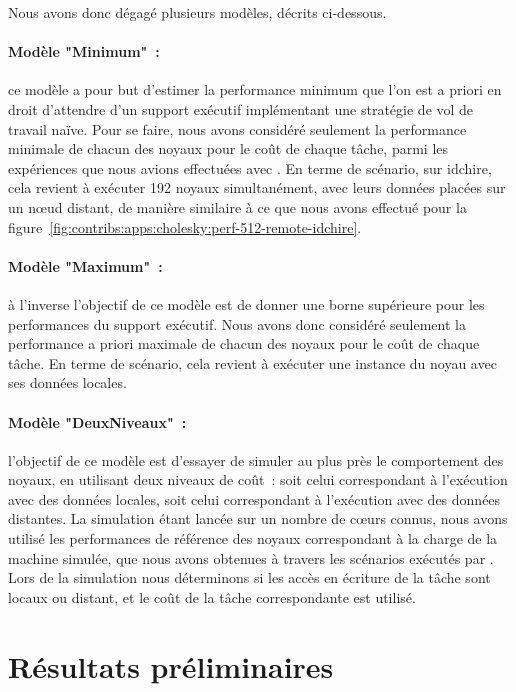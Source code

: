 Nous avons donc dégagé plusieurs modèles, décrits ci-dessous.

\paragraph{Modèle "Minimum"~:} ce modèle a pour but d'estimer la performance minimum que l'on est a priori en droit d'attendre d'un support exécutif implémentant une stratégie de vol de travail naïve.
Pour se faire, nous avons considéré seulement la performance minimale de chacun des noyaux pour le coût de chaque tâche, parmi les expériences que nous avions effectuées avec \outil.
En terme de scénario, sur idchire, cela revient à exécuter 192 noyaux simultanément, avec leurs données placées sur un nœud distant, de manière similaire à ce que nous avons effectué pour la figure~\ref{fig:contribs:apps:cholesky:perf-512-remote-idchire}.

\paragraph{Modèle "Maximum"~:} à l'inverse l'objectif de ce modèle est de donner une borne supérieure pour les performances du support exécutif.
Nous avons donc considéré seulement la performance a priori maximale de chacun des noyaux pour le coût de chaque tâche.
En terme de scénario, cela revient à exécuter une instance du noyau avec ses données locales.

\paragraph{Modèle "DeuxNiveaux"~:} l'objectif de ce modèle est d'essayer de simuler au plus près le comportement des noyaux, en utilisant deux niveaux de coût~: soit celui correspondant à l'exécution avec des données locales, soit celui correspondant à l'exécution avec des données distantes.
La simulation étant lancée sur un nombre de cœurs connus, nous avons utilisé les performances de référence des noyaux correspondant à la charge de la machine simulée, que nous avons obtenues à travers les scénarios exécutés par \outil.
Lors de la simulation nous déterminons si les accès en écriture de la tâche sont locaux ou distant, et le coût de la tâche correspondante est utilisé.




\section{Résultats préliminaires}\label{sec:simulation:resultats}


